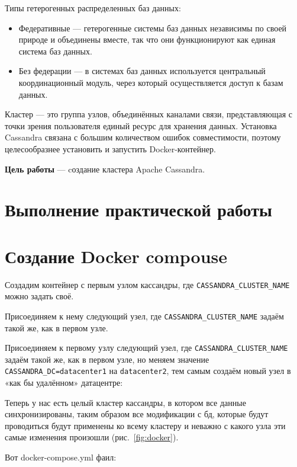 Типы гетерогенных распределенных баз данных:
\begin{itemize}
	\item Федеративные — гетерогенные системы баз данных независимы по
	своей природе и объединены вместе, так что они функционируют как
	единая система баз данных.
	\item Без федерации — в системах баз данных используется центральный
	координационный модуль, через который осуществляется доступ к
	базам данных.
\end{itemize}

Кластер --- это группа узлов, объединённых каналами связи, представляющая с точки зрения пользователя единый ресурс для
хранения данных.
Установка Cassandra связана с большим количеством ошибок совместимости, поэтому целесообразнее установить и запустить
Docker-контейнер.

\textbf{Цель работы} --- cоздание кластера Apache Cassandra.

\clearpage

\section*{\LARGE Выполнение практической работы}

\section{Создание Docker compouse}

Создадим контейнер с первым узлом кассандры, где
\texttt{CASSANDRA\_CLUSTER\_NAME} можно задать своё.

Присоединяем к нему следующий узел, где
\texttt{CASSANDRA\_CLUSTER\_NAME} задаём такой же, как в первом узле.

Присоединяем к первому узлу следующий узел, где
\texttt{CASSANDRA\_CLUSTER\_NAME} задаём такой же, как в первом узле,
но меняем значение \texttt{CASSANDRA\_DC=datacenter1} на \texttt{datacenter2},
тем самым создаём новый узел в «как бы удалённом» датацентре:

Теперь у нас есть целый кластер кассандры, в котором все данные
синхронизированы, таким образом все модификации с бд, которые
будут проводиться будут применены ко всему кластеру и неважно с
какого узла эти самые изменения произошли (рис.~\ref{fig:docker}).

Вот docker-compose.yml фаил:



